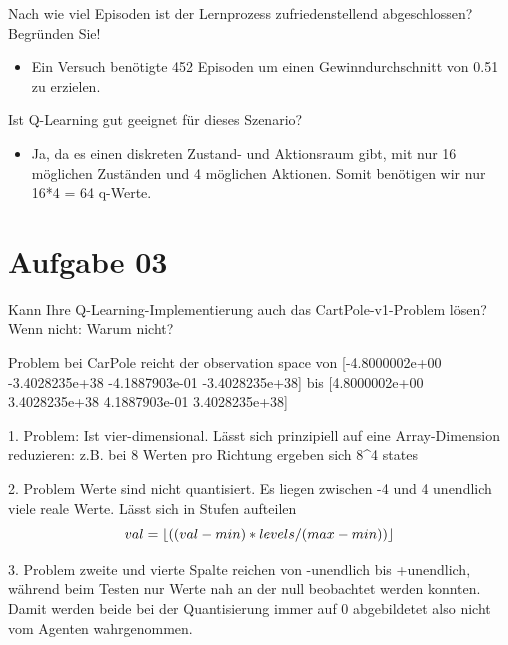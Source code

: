 \documentclass{ocbeameruni}
\DeclarePairedDelimiter\floor{\lfloor}{\rfloor}
\begin{document}
\begin{frame}[2.4]
Nach wie viel Episoden ist der Lernprozess zufriedenstellend abgeschlossen? Begründen Sie!
\begin{itemize}
\item Ein Versuch benötigte 452 Episoden um einen Gewinndurchschnitt von 0.51 zu erzielen.
\end{itemize}
\end{frame}


\begin{frame}[2.5]
Ist Q-Learning gut geeignet für dieses Szenario?
\begin{itemize}
\item Ja, da es einen diskreten Zustand- und Aktionsraum gibt, mit nur 16 möglichen Zuständen und 4 möglichen Aktionen.
Somit benötigen wir nur 16*4 = 64 q-Werte.
\end{itemize}
\end{frame}

\section{Aufgabe 03}

\begin{frame}[3.1]
Kann Ihre Q-Learning-Implementierung auch das CartPole-v1-Problem lösen? Wenn nicht:
Warum nicht?

Problem bei CarPole reicht der observation space
von
[-4.8000002e+00 -3.4028235e+38 -4.1887903e-01 -3.4028235e+38]
bis
[4.8000002e+00 3.4028235e+38 4.1887903e-01 3.4028235e+38]
\end{frame}

\begin{frame}[3.1]
1. Problem: Ist vier-dimensional. Lässt sich prinzipiell auf eine Array-Dimension reduzieren:
z.B. bei 8 Werten pro Richtung ergeben sich 8^4 states

2. Problem Werte sind nicht quantisiert. Es liegen zwischen -4 und 4 unendlich viele reale Werte. 
Lässt sich in Stufen aufteilen
\[val = \floor*{((val - min) * levels / (max - min))}\]
\end{frame}


\begin{frame}[3.1]
3. Problem zweite und vierte Spalte reichen von -unendlich bis +unendlich, während beim Testen 
nur Werte nah an der null beobachtet werden konnten. Damit werden beide bei der Quantisierung
immer auf 0 abgebildetet also nicht vom Agenten wahrgenommen.
\end{frame}
\end{document}
